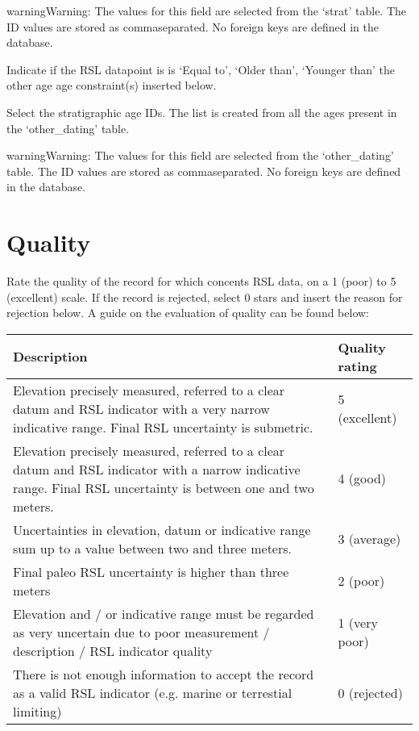 \documentclass[letterpaper,10pt,english]{sphinxmanual}
\begin{document}
\begin{sphinxadmonition}{warning}{Warning:}
The values for this field are selected from the ‘strat’ table. The ID values are stored as comma\sphinxhyphen{}separated. No foreign keys are defined in the database.
\end{sphinxadmonition}

 \sphinxhyphen{} Indicate if the RSL datapoint is is ‘Equal to’, ‘Older than’, ‘Younger than’ the other age age constraint(s) inserted below.

 \sphinxhyphen{} Select the stratigraphic age IDs. The list is created from all the ages present in the ‘other\_dating’ table.

\begin{sphinxadmonition}{warning}{Warning:}
The values for this field are selected from the ‘other\_dating’ table. The ID values are stored as comma\sphinxhyphen{}separated. No foreign keys are defined in the database.
\end{sphinxadmonition}


\section{Quality}
\label{\detokenize{RSL_data:quality}}
 \sphinxhyphen{} Rate the quality of the record for which concents RSL data, on a 1 (poor) to 5 (excellent) scale. If the record is rejected, select 0 stars and insert the reason for rejection below. A guide on the evaluation of quality can be found below:


\begin{savenotes}\sphinxattablestart
\centering
\begin{tabulary}{\linewidth}[t]{|T|T|}
\hline

Description
&
Quality rating
\\
\hline
Elevation precisely measured, referred to a clear datum and RSL indicator with a very narrow indicative range. Final RSL uncertainty is submetric.
&
5 (excellent)
\\
\hline
Elevation precisely measured, referred to a clear datum and RSL indicator with a narrow indicative range. Final RSL uncertainty is between one and two meters.
&
4 (good)
\\
\hline
Uncertainties in elevation, datum or indicative range sum up to a value between two and three meters.
&
3 (average)
\\
\hline
Final paleo RSL uncertainty is higher than three meters
&
2 (poor)
\\
\hline
Elevation and / or indicative range must be regarded as very uncertain due to poor measurement / description / RSL indicator quality
&
1 (very poor)
\\
\hline
There is not enough information to accept the record as a valid RSL indicator (e.g. marine or terrestial limiting)
&
0 (rejected)
\\
\hline
\end{tabulary}
\par
\sphinxattableend\end{savenotes}
\end{document}
